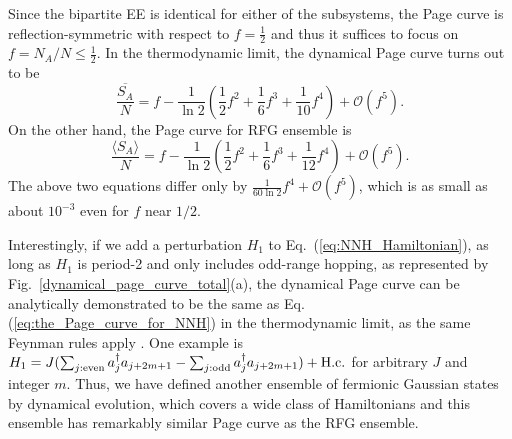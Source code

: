 \documentclass[twocolumn,english,prl,aps,superscriptaddress,amsmath,amssymb,floatfix]{revtex4-2}
\begin{document}
Since the bipartite EE is identical for either of the subsystems, the Page curve is reflection-symmetric with respect to $f=\frac{1}{2}$ and thus %
 it suffices to %
focus on $f=N_A/N\leq\frac{1}{2}$. In the thermodynamic limit, the dynamical Page curve turns out to be \cite{SM} 
\begin{equation}
\frac{\overline{S_{A}}}{N}=f-\frac{1}{\ln{2}}\left(\frac{1}{2}f^{2}+\frac{1}{6}f^{3}+\frac{1}{10}f^{4}\right)+\mathcal{O}(f^{5}).\label{eq:the_Page_curve_for_NNH}
\end{equation}
 On the other hand, the %
 Page curve for RFG ensemble
is \citep{Bianchi2021}
\begin{equation}
\frac{\langle S_{A}\rangle}{N}=f-\frac{1}{\ln{2}}\left(\frac{1}{2}f^{2}+\frac{1}{6}f^{3}+\frac{1}{12}f^{4}\right)+\mathcal{O}(f^{5}).\label{eq:the_Page_curve_result_for_CCRFG}
\end{equation}
The above two equations differ %
only by $\frac{1}{60\ln{2}}f^{4}+\mathcal{O}(f^5)$, %
which is as small as about $%
10^{-3}$ even for $f$ near $1/2$.


Interestingly, if we add a perturbation $H_{1}$ to Eq.~(\ref{eq:NNH_Hamiltonian}),
as long as $H_{1}$ is period-2 %
and %
only includes %
odd-range hopping, as represented by Fig.~\ref{dynamical_page_curve_total}(a),  %
the dynamical Page curve can be analytically demonstrated %
to be the same as Eq. (\ref{eq:the_Page_curve_for_NNH}) in the thermodynamic %
limit, as the same Feynman rules apply \cite{SM}. %
One example %
is $H_{1}=J(\sum_{j:\mathrm{even}}a_{j}^{\dagger}a_{j+2m+1}-\sum_{j:\mathrm{odd}}a_{j}^{\dagger}a_{j+2m+1})+{\rm H.c.}$
for arbitrary $J$ and integer $m$. Thus, we have defined another ensemble
of fermionic Gaussian states by dynamical evolution, which covers a
wide class of Hamiltonians and this ensemble has remarkably similar
Page curve as the RFG ensemble. 
\end{document}
